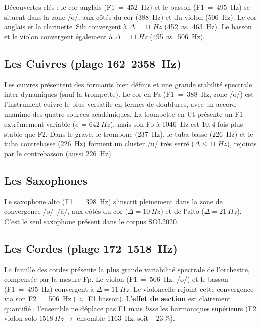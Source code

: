 \documentclass[11pt,a4paper]{article}
\begin{document}
Découvertes clés : le cor anglais (F1~=~\SI{452}{Hz}) et le basson
(F1~=~\SI{495}{Hz}) se situent dans la zone /o/, aux côtés du cor
(\SI{388}{Hz}) et du violon (\SI{506}{Hz}). Le cor anglais et la
clarinette~Sib convergent à $\Delta = \SI{11}{Hz}$ (452 \emph{vs.}\
\SI{463}{Hz}). Le basson et le violon convergent également à $\Delta =
\SI{11}{Hz}$ (495 \emph{vs.}\ \SI{506}{Hz}).

\subsection{Les Cuivres (plage 162--\SI{2358}{Hz})}

Les cuivres présentent des formants bien définis et une grande stabilité
spectrale inter-dynamiques (sauf la trompette). Le cor en Fa
(F1~=~\SI{388}{Hz}, zone /o/) est l'instrument cuivre le plus versatile
en termes de doublures, avec un accord unanime des quatre sources
académiques. La trompette en Ut présente un F1 extrêmement variable
($\sigma = \SI{642}{Hz}$), mais son Fp à \SI{1046}{Hz} est $10{,}4$
fois plus stable que F2. Dans le grave, le trombone (\SI{237}{Hz}), le
tuba basse (\SI{226}{Hz}) et le tuba contrebasse (\SI{226}{Hz}) forment
un cluster /u/ très serré ($\Delta \leq \SI{11}{Hz}$), rejoints par le
contrebasson (aussi \SI{226}{Hz}).

\subsection{Les Saxophones}

Le saxophone alto (F1~=~\SI{398}{Hz}) s'inscrit pleinement dans la zone
de convergence /o/--/\r{a}/, aux côtés du cor ($\Delta = \SI{10}{Hz}$)
et de l'alto ($\Delta = \SI{21}{Hz}$). C'est le seul saxophone présent
dans le corpus SOL2020.

\subsection{Les Cordes (plage 172--\SI{1518}{Hz})}

La famille des cordes présente la plus grande variabilité spectrale de
l'orchestre, compensée par la mesure Fp. Le violon
(F1~=~\SI{506}{Hz}, /o/) et le basson (F1~=~\SI{495}{Hz}) convergent à
$\Delta = \SI{11}{Hz}$. Le violoncelle rejoint cette convergence via son
F2~=~\SI{506}{Hz} ($\approx$ F1 basson). L'\textbf{effet de section}
est clairement quantifié : l'ensemble ne déplace pas F1 mais
\emph{lisse} les harmoniques supérieurs (F2 violon solo
$\SI{1518}{Hz} \to$ ensemble \SI{1163}{Hz}, soit $-23\,\%$).
\end{document}
